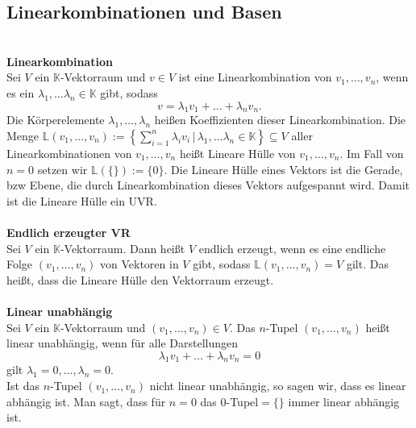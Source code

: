 \documentclass[a4paper,12pt]{article}
\begin{document}
\subsection{Linearkombinationen und Basen}
\hfill\\\textbf{Linearkombination}\\ 
Sei $V$ ein $\mathbb{K}$-Vektorraum und $v \in V$ ist eine Linearkombination von $v_1,\hdots ,v_n$, wenn es ein $\lambda _1,\hdots \lambda _n  \in \mathbb{K}$ gibt, sodass
\[ 
        v=\lambda _1v_1+\hdots +\lambda _nv_n
.\] 
Die Körperelemente $\lambda _1,\hdots ,\lambda _n$ heißen Koeffizienten dieser Linearkombination. Die Menge $\mathbb{L}\left(v_1,\hdots ,v_n\right):=\left\{\sum_{i=1}^{n}\lambda _iv_i\,|\, \lambda _1,\hdots \lambda _n  \in \mathbb{K}\right\}\subseteq V$ aller Linearkombinationen von $v_1,\hdots ,v_n$ heißt Lineare Hülle von $v_1,\hdots ,v_n$. Im Fall von $n=0$ setzen wir $\mathbb{L}\left(\{\}\right):=\{0\}$. Die Lineare Hülle eines Vektors ist die Gerade, bzw Ebene, die durch Linearkombination dieses Vektors aufgespannt wird. Damit ist die Lineare Hülle ein UVR.
\\\hfill\\\textbf{Endlich erzeugter VR}\\ 
Sei $V$ ein $\mathbb{K}$-Vektorraum. Dann heißt $V$ endlich erzeugt, wenn es eine endliche Folge $\left(v_1,\hdots ,v_n\right)$ von Vektoren in $V$ gibt, sodass $\mathbb{L}\left(v_1,\hdots ,v_n\right)=V$ gilt. Das heißt, dass die Lineare Hülle den Vektorraum erzeugt.
\\\hfill\\\textbf{Linear unabhängig}\\ 
Sei $V$ ein $\mathbb{K}$-Vektorraum und $\left(v_1,\hdots ,v_n\right) \in V$. Das $n$-Tupel $\left(v_1,\hdots ,v_n\right)$ heißt linear unabhängig, wenn für alle Darstellungen
\[ 
        \lambda _1v_1+\hdots +\lambda _nv_n=0
\] 
gilt $\lambda _1=0,\hdots ,\lambda _n=0$.\\Ist das $n$-Tupel $\left(v_1,\hdots ,v_n\right)$ nicht linear unabhängig, so sagen wir, dass es linear abhängig ist. Man sagt, dass für $n=0$ das 0-Tupel$=\{\}$ immer linear abhängig ist.
\end{document}
